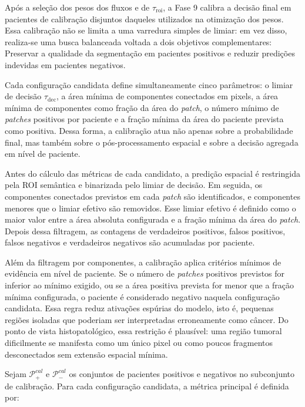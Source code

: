 Após a seleção dos pesos dos fluxos e de $\tau_{\mathrm{roi}}$, a Fase 9 calibra
a decisão final em pacientes de calibração disjuntos daqueles utilizados na
otimização dos pesos. Essa calibração não se limita a uma varredura simples de
limiar: em vez disso, realiza-se uma busca balanceada voltada a dois objetivos
complementares: Preservar a qualidade da segmentação em pacientes positivos e
reduzir predições indevidas em pacientes negativos.

Cada configuração candidata define simultaneamente cinco parâmetros: o limiar de
decisão $\tau_{\mathrm{dec}}$, a área mínima de componentes conectados em pixels,
a área mínima de componentes como fração da área do \textit{patch}, o número
mínimo de \textit{patches} positivos por paciente e a fração mínima da área do
paciente prevista como positiva. Dessa forma, a calibração atua não apenas sobre
a probabilidade final, mas também sobre o pós-processamento espacial e sobre a
decisão agregada em nível de paciente.

Antes do cálculo das métricas de cada candidato, a predição espacial é
restringida pela ROI semântica e binarizada pelo limiar de decisão. Em seguida,
os componentes conectados previstos em cada \textit{patch} são identificados, e
componentes menores que o limiar efetivo são removidos. Esse limiar efetivo é
definido como o maior valor entre a área absoluta configurada e a fração mínima
da área do \textit{patch}. Depois dessa filtragem, as contagens de verdadeiros
positivos, falsos positivos, falsos negativos e verdadeiros negativos são
acumuladas por paciente.

Além da filtragem por componentes, a calibração aplica critérios mínimos de
evidência em nível de paciente. Se o número de \textit{patches} positivos
previstos for inferior ao mínimo exigido, ou se a área positiva prevista for
menor que a fração mínima configurada, o paciente é considerado negativo naquela
configuração candidata. Essa regra reduz ativações espúrias do modelo, isto é,
pequenas regiões isoladas que poderiam ser interpretadas erroneamente como
câncer. Do ponto de vista histopatológico, essa restrição é plausível: uma região
tumoral dificilmente se manifesta como um único pixel ou como poucos fragmentos
desconectados sem extensão espacial mínima.

Sejam $\mathcal{P}_+^{cal}$ e $\mathcal{P}_-^{cal}$ os conjuntos de pacientes
positivos e negativos no subconjunto de calibração. Para cada configuração
candidata, a métrica principal é definida por:

